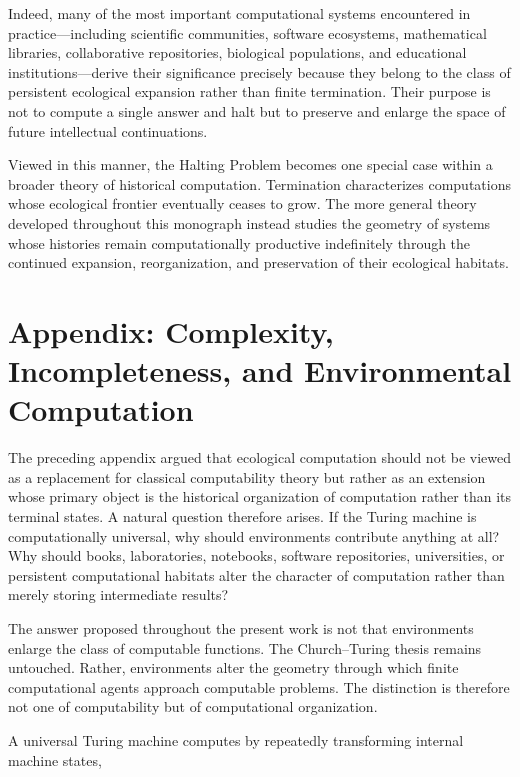 \documentclass[12pt,oneside]{article}
\theoremstyle{remark}
\begin{document}
Indeed, many of the most important computational systems encountered in
practice—including scientific communities, software ecosystems, mathematical
libraries, collaborative repositories, biological populations, and educational
institutions—derive their significance precisely because they belong to the
class of persistent ecological expansion rather than finite termination. Their
purpose is not to compute a single answer and halt but to preserve and enlarge
the space of future intellectual continuations.

Viewed in this manner, the Halting Problem becomes one special case within a
broader theory of historical computation. Termination characterizes computations
whose ecological frontier eventually ceases to grow. The more general theory
developed throughout this monograph instead studies the geometry of systems
whose histories remain computationally productive indefinitely through the
continued expansion, reorganization, and preservation of their ecological
habitats.

\section{Appendix: Complexity, Incompleteness, and Environmental Computation}

The preceding appendix argued that ecological computation should not be viewed
as a replacement for classical computability theory but rather as an extension
whose primary object is the historical organization of computation rather than
its terminal states. A natural question therefore arises. If the Turing machine
is computationally universal, why should environments contribute anything at
all? Why should books, laboratories, notebooks, software repositories,
universities, or persistent computational habitats alter the character of
computation rather than merely storing intermediate results?

The answer proposed throughout the present work is not that environments enlarge
the class of computable functions. The Church--Turing thesis remains untouched.
Rather, environments alter the geometry through which finite computational
agents approach computable problems. The distinction is therefore not one of
computability but of computational organization.

A universal Turing machine computes by repeatedly transforming internal machine
states,
\end{document}

